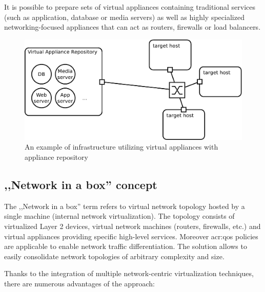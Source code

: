 \documentclass[11pt,openany]{book}
\begin{document}
        It is possible to prepare sets of virtual appliances containing traditional services (such as application,
        database or media servers) as well as highly specialized networking-focused appliances that can act as routers,
        firewalls or load balancers.
        

        \begin{figure}[H]
          \begin{center}
            \includegraphics[width=.7\textwidth]{img/solaris/virtual-appliance-infra.pdf}
          \end{center}

          \caption{An example of infrastructure utilizing virtual appliances with appliance repository}
        \end{figure}


      \subsection{,,Network in a box'' concept}

        The ,,Network in a box'' term refers to virtual network topology hosted by a single machine (internal network
        virtualization). The topology consists of virtualized Layer 2 devices, virtual network machines (routers,
        firewalls, etc.) and virtual appliances providing specific high-level services. Moreover \gls{acr:qos} policies
        are applicable to enable network traffic differentiation. The solution allows to easily consolidate network
        topologies of arbitrary complexity and size.

        Thanks to the integration of multiple network-centric virtualization techniques, there are numerous advantages
        of the approach:
\end{document}

